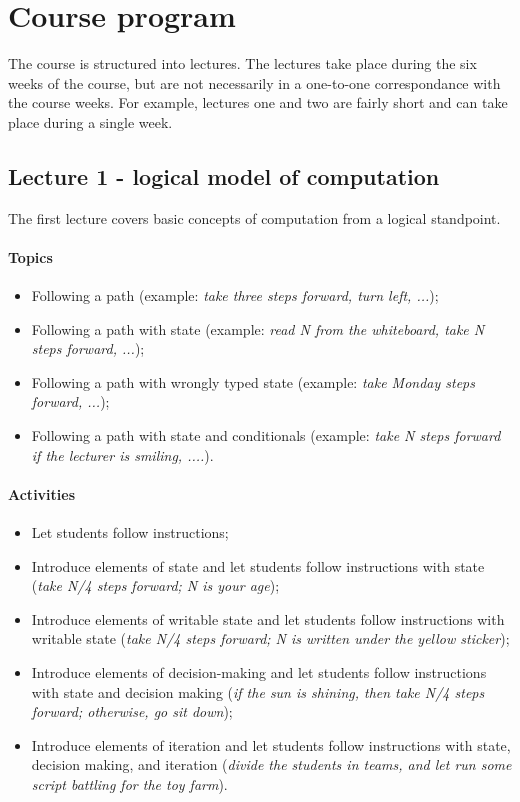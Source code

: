 \section{Course program}
	The course is structured into lectures. The lectures take place during the six weeks of the course, but are not necessarily in a one-to-one correspondance with the course weeks. For example, lectures one and two are fairly short and can take place during a single week.

	\subsection{Lecture 1 - logical model of computation}
		The first lecture covers basic concepts of computation from a logical standpoint.

		\paragraph*{Topics}
			\begin{itemize}
				\item Following a path (example: \textit{take three steps forward, turn left, ...});
				\item Following a path with state (example: \textit{read N from the whiteboard, take N steps forward, ...});
				\item Following a path with wrongly typed state (example: \textit{take Monday steps forward, ...});
				\item Following a path with state and conditionals (example: \textit{take N steps forward if the lecturer is smiling, ....}).
			\end{itemize}

		\paragraph*{Activities}
			\begin{itemize}
				\item Let students follow instructions;
				\item Introduce elements of state and let students follow instructions with state (\textit{take N/4 steps forward; N is your age});
				\item Introduce elements of writable state and let students follow instructions with writable state (\textit{take N/4 steps forward; N is written under the yellow sticker});
				\item Introduce elements of decision-making and let students follow instructions with state and decision making (\textit{if the sun is shining, then take N/4 steps forward; otherwise, go sit down});
				\item Introduce elements of iteration and let students follow instructions with state, decision making, and iteration (\textit{divide the students in teams, and let run some script battling for the toy farm}).
			\end{itemize}

